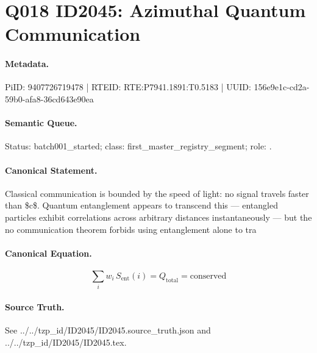 \section*{Q018 ID2045: Azimuthal Quantum Communication}
\paragraph{Metadata.}
PiID: 9407726719478 | RTEID: RTE:P7941.1891:T0.5183 | UUID: 156e9e1c-cd2a-59b0-afa8-36cd643e90ea

\paragraph{Semantic Queue.}
Status: batch001\_started; class: first\_master\_registry\_segment; role: .

\paragraph{Canonical Statement.}
Classical communication is bounded by the speed of light: no signal travels faster than \$c\$. Quantum entanglement appears to transcend this — entangled particles exhibit correlations across arbitrary distances instantaneously — but the no communication theorem forbids using entanglement alone to tra

\paragraph{Canonical Equation.}
\[
\sum_i w_i\, S_\text{ent}(i) = Q_\text{total} = \text{conserved}
\]

\paragraph{Source Truth.}
See ../../tzp\_id/ID2045/ID2045.source\_truth.json and ../../tzp\_id/ID2045/ID2045.tex.
